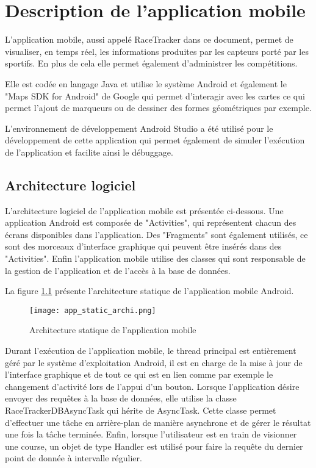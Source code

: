 \chapter{Description de l'application mobile}\label{ch:app_mobile}

L'application mobile, aussi appelé RaceTracker dans ce document, permet de visualiser, en temps réel, les informations produites par les capteurs porté par les sportifs. En plus de cela elle permet également d'administrer les compétitions.

Elle est codée en langage Java et utilise le système Android et également le "Maps SDK for Android" de Google qui permet d'interagir avec les cartes ce qui permet l'ajout de marqueurs ou de dessiner des formes géométriques par exemple.

L'environnement de développement Android Studio a été utilisé pour le développement de cette application qui permet également de simuler l'exécution de l'application et facilite ainsi le débuggage.


\section{Architecture logiciel}

L'architecture logiciel de l'application mobile est présentée ci-dessous. Une application Android est composée de "Activities", qui représentent chacun des écrans disponibles dans l'application. Des "Fragments" sont également utilisés, ce sont des morceaux d'interface graphique qui peuvent être insérés dans des "Activities". Enfin l'application mobile utilise des classes qui sont responsable de la gestion de l'application et de l'accès à la base de données.

La figure \ref{fig:app_static_archi} présente l'architecture statique de l'application mobile Android.

\begin{figure}[htb]
\centering 
\texttt{[image: app\_static\_archi.png]} 
\caption{Architecture statique de l'application mobile}
\label{fig:app_static_archi}
\end{figure}

Durant l'exécution de l'application mobile, le thread principal est entièrement géré par le système d'exploitation Android, il est en charge de la mise à jour de l'interface graphique et de tout ce qui est en lien comme par exemple le changement d'activité lors de l'appui d'un bouton. Lorsque l'application désire envoyer des requêtes à la base de données, elle utilise la classe RaceTrackerDBAsyncTask qui hérite de AsyncTask. Cette classe permet d'effectuer une tâche en arrière-plan de manière asynchrone et de gérer le résultat une fois la tâche terminée. Enfin, lorsque l'utilisateur est en train de visionner une course, un objet de type Handler est utilisé pour faire la requête du dernier point de donnée à intervalle régulier.

